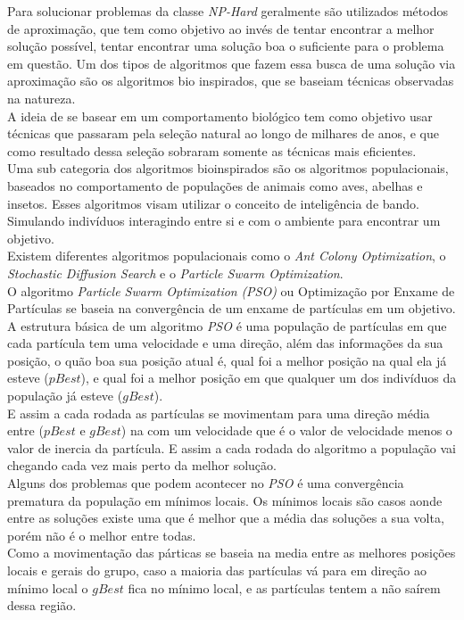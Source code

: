 Para solucionar problemas da classe \textit{NP-Hard} geralmente são utilizados métodos de aproximação, que tem como objetivo ao invés de tentar encontrar a melhor solução possível, tentar encontrar uma solução boa o suficiente para o problema em questão.
Um dos tipos de algoritmos que fazem essa busca de uma solução via aproximação são os algoritmos bio inspirados, que se baseiam técnicas observadas na natureza.\\
\indent A ideia de se basear em um comportamento biológico tem como objetivo usar técnicas que passaram pela seleção natural ao longo de milhares de anos, e que como resultado dessa seleção sobraram somente as técnicas mais eficientes.\\

Uma sub categoria dos algoritmos bioinspirados são os algoritmos populacionais, baseados no comportamento de populações de animais como aves, abelhas e insetos.
Esses algoritmos visam utilizar o conceito de inteligência de bando. Simulando indivíduos interagindo entre si e com o ambiente para encontrar um objetivo.\\
Existem diferentes algoritmos populacionais como o \textit{Ant Colony Optimization}, o \textit{Stochastic Diffusion Search} e o \textit{Particle Swarm Optimization}.\\

O algoritmo \textit{Particle Swarm Optimization} \textit{(PSO)} ou Optimização por Enxame de Partículas se baseia na convergência de um enxame de partículas em um objetivo.\\
A estrutura básica de um algoritmo \textit{PSO} é uma população de partículas em que cada partícula tem uma velocidade e uma direção, além das informações da sua posição, o quão boa sua posição atual é, qual foi a melhor posição na qual ela já esteve ($pBest$), e qual foi a melhor posição em que qualquer um dos indivíduos da população já esteve ($gBest$).\\
E assim a cada rodada as partículas se movimentam para uma direção média entre ($pBest$ e $gBest$) na com um velocidade que é o valor de velocidade menos o valor de inercia da partícula. 
E assim a cada rodada do algoritmo a população vai chegando cada vez mais perto da melhor solução.\\

Alguns dos problemas que podem acontecer no \textit{PSO} é uma convergência prematura da população em mínimos locais.
Os mínimos locais são casos aonde entre as soluções existe uma que é melhor que a média das soluções a sua volta, porém não é o melhor entre todas.\\
Como a movimentação das párticas se baseia na media entre as melhores posições locais e gerais do grupo, caso a maioria das partículas vá para em direção ao mínimo local o $gBest$ fica no mínimo local, e as partículas tentem a não saírem dessa região.\\

